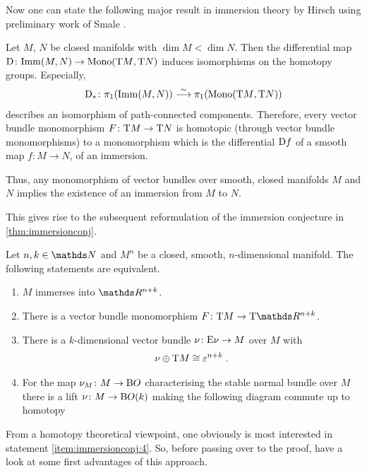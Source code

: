 Now one can state the following major result in immersion theory by
Hirsch using preliminary work of Smale
\cite[Sections~5 and 6]{hirschimmersions}.
\begin{Thm}\label{thm:hirschsmale}
  Let $M$, $N$ be closed manifolds with $\dim M<\dim N$.
  Then the differential map
  $\mathrm{D}\colon \mathrm{Imm}({M},{N})\to \mathrm{Mono}({\mathrm{T}M},{\mathrm{T}N})$
  induces isomorphisms on the homotopy groups.
  Especially,
  \begin{gather*}
    \mathrm{D}_*\colon
    \pi_1(\mathrm{Imm}({M},{N})) \overset\sim{\longrightarrow} \pi_1(\mathrm{Mono}({\mathrm{T}M},{\mathrm{T}N}))
  \end{gather*}
  describes an isomorphism of path-connected components.
  Therefore, every vector bundle monomorphism
  $F\colon\mathrm{T}M\to\mathrm{T}N$ is homotopic (through vector bundle
  monomorphisms) to a monomorphism which is the differential
  $\mathrm{D} f$ of a smooth map $f\colon M\to N$, \idest of an
  immersion.
\end{Thm}
Thus, any monomorphism of vector bundles over smooth, closed
manifolds $M$ and $N$ implies the existence of an immersion from $M$
to $N$.

This gives rise to the subsequent reformulation of the immersion
conjecture in \autoref{thm:immersionconj}.
\begin{Thm}\label{thm:immersionconj:equivalences}
  Let $n,k\in\Nat$ and $M^n$ be a closed, smooth, $n$-dimensional manifold.
  The following statements are equivalent.
  \begin{enumerate}
  \item\label{item:immersionconj:1}
    $M$ immerses into $\R^{n+k}$.
  \item\label{item:immersionconj:2}
    There is a vector bundle monomorphism $F\colon\T M\to\T{\R^{n+k}}$.
  \item\label{item:immersionconj:3}
    There is a $k$-dimensional vector bundle
    $\nu_{}\colon\mathrm{E}\nu_{}\to M$ over $M$ with
    \begin{gather*}
      \nu_{}\oplus\mathrm{T}M\cong\varepsilon^{n+k}
      \;.
    \end{gather*}
  \item\label{item:immersionconj:4}
    For the map $\nu_{M}\colon M\to\mathrm{B}O$ characterising the stable
    normal bundle over $M$ there is a lift $\nu_{}\colon M\to\mathrm{B}O(k)$
    making the following diagram commute up to homotopy
    \begin{center}
    \end{center}
  \end{enumerate}
\end{Thm}
From a homotopy theoretical viewpoint, one obviously is most
interested in statement \ref{item:immersionconj:4}.
So, before passing over to the proof, have a look at some first
advantages of this approach.

